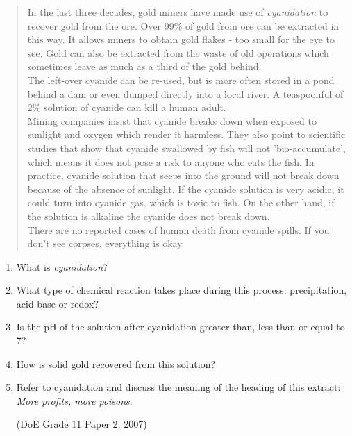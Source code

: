 {\begin{enumerate}
{\begin{quote}
{In the last three decades, gold miners have made use of \textit{cyanidation} to recover gold from the ore. Over 99\% of gold from ore can be extracted in this way. It allows miners to obtain gold flakes - too small for the eye to see. Gold can also be extracted from the waste of old operations which sometimes leave as much as a third of the gold behind.\\

The left-over cyanide can be re-used, but is more often stored in a pond behind a dam or even dumped directly into a local river. A teaspoonful of 2\% solution of cyanide can kill a human adult.\\

Mining companies insist that cyanide breaks down when exposed to sunlight and oxygen which render it harmless. They also point to scientific studies that show that cyanide swallowed by fish will not 'bio-accumulate', which means it does not pose a risk to anyone who eats the fish. In practice, cyanide solution that seeps into the ground will not break down because of the absence of sunlight. If the cyanide solution is very acidic, it could turn into cyanide gas, which is toxic to fish. On the other hand, if the solution is alkaline the cyanide does not break down.\\

There are no reported cases of human death from cyanide spills. If you don't see corpses, everything is okay.
}
\end{quote}
}
	\begin{enumerate}
	\item{What is \textit{cyanidation}?}
	\item{What type of chemical reaction takes place during this process: precipitation, acid-base or redox?}
	\item{Is the pH of the solution after cyanidation greater than, less than or equal to 7?}
	\item{How is solid gold recovered from this solution?}
	\item{Refer to cyanidation and discuss the meaning of the heading of this extract: \textit{More profits, more poisons}.}

(DoE Grade 11 Paper 2, 2007)
	\end{enumerate}
\end{enumerate}
}









